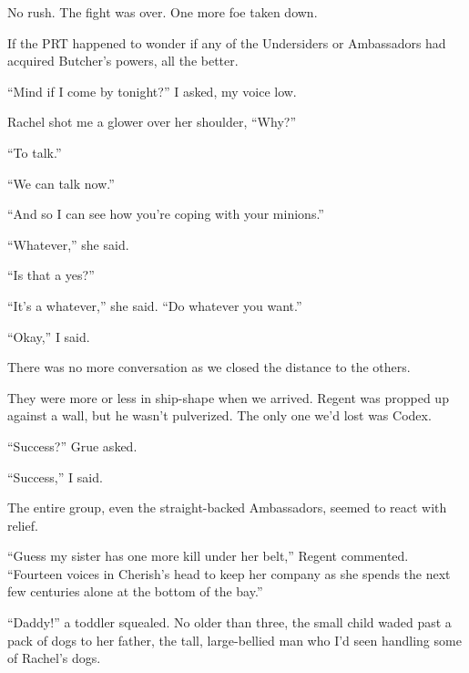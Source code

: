No rush.  The fight was over.  One more foe taken down.



If the PRT happened to wonder if any of the Undersiders or Ambassadors had acquired Butcher's powers, all the better.



``Mind if I come by tonight?'' I asked, my voice low.



Rachel shot me a glower over her shoulder, ``Why?''



``To talk.''



``We can talk now.''



``And so I can see how you're coping with your minions.''



``Whatever,'' she said.



``Is that a yes?''



``It's a whatever,'' she said.  ``Do whatever you want.''



``Okay,'' I said.



There was no more conversation as we closed the distance to the others.



They were more or less in ship-shape when we arrived.  Regent was propped up against a wall, but he wasn't pulverized.  The only one we'd lost was Codex.



``Success?'' Grue asked.



``Success,'' I said.



The entire group, even the straight-backed Ambassadors, seemed to react with relief.



``Guess my sister has one more kill under her belt,'' Regent commented.  ``Fourteen voices in Cherish's head to keep her company as she spends the next few centuries alone at the bottom of the bay.''



\sectionbreak



``Daddy!'' a toddler squealed.  No older than three, the small child waded past a pack of dogs to her father, the tall, large-bellied man who I'd seen handling some of Rachel's dogs.



